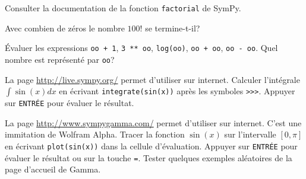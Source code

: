 \begin{exercice}
    Consulter la documentation de la fonction \texttt{factorial} de SymPy.
\end{exercice}

\begin{exercice}
    Avec combien de zéros le nombre $100!$ se termine-t-il?
\end{exercice}

\begin{exercice}
    Évaluer les expressions \texttt{oo + 1}, \texttt{3 ** oo},
    \texttt{log(oo)}, \texttt{oo + oo}, \texttt{oo - oo}. Quel nombre est
    représenté par \texttt{oo}?
\end{exercice}

\begin{exercice}
    La page \url{http://live.sympy.org/} permet d'utiliser \sympy sur
    internet. Calculer l'intégrale $\int\sin(x)dx$ en écrivant
    \texttt{integrate(sin(x))} après les symboles \verb|>>>|. Appuyer sur
    \texttt{ENTRÉE} pour évaluer le résultat.
\end{exercice}

\begin{exercice}
    La page \url{http://www.sympygamma.com/} permet d'utiliser \sympy
    sur internet. C'est une immitation de Wolfram Alpha.
    Tracer la fonction $\sin(x)$ sur l'intervalle $[0,\pi]$ en écrivant
    \texttt{plot(sin(x))} dans la cellule d'évaluation. Appuyer sur
    \texttt{ENTRÉE} pour évaluer le résultat ou sur la touche \texttt{=}.
    Tester quelques exemples aléatoires de la page d'accueil de \sympy Gamma.
\end{exercice}

